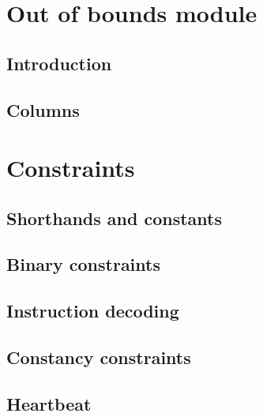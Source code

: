 

\section{Out of bounds module}                    
\subsection{Introduction}                                                                                       \label{oob: intro}
\subsection{Columns}                                                                                          \label{oob: columns}
                                                                                                        
\section{Constraints}                                                                                   
\subsection{Shorthands and constants}                                                                                                              \label{oob: shorthands}
\subsection{Binary constraints}                                                                                \label{oob: binary}
\subsection{Instruction decoding}                                                                            \label{oob: instruction decoding}
\subsection{Constancy constraints}                                                                        \label{oob: counter-constancies} 
\subsection{Heartbeat}                                                                                      \label{oob: heartbeat}

